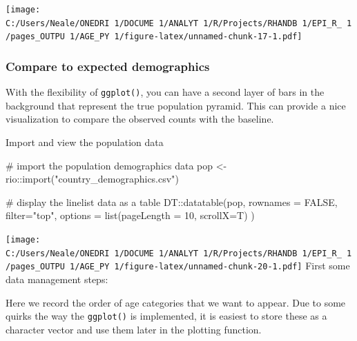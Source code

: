 \documentclass[
]{article}
\newenvironment{Shaded}{\begin{snugshade}}{\end{snugshade}}
\newcommand{\CommentTok}[1]{\textcolor[rgb]{0.50,0.62,0.50}{#1}}
\newcommand{\DataTypeTok}[1]{\textcolor[rgb]{0.87,0.87,0.75}{#1}}
\newcommand{\DecValTok}[1]{\textcolor[rgb]{0.86,0.86,0.80}{#1}}
\newcommand{\KeywordTok}[1]{\textcolor[rgb]{0.94,0.87,0.69}{#1}}
\newcommand{\NormalTok}[1]{\textcolor[rgb]{0.80,0.80,0.80}{#1}}
\newcommand{\OperatorTok}[1]{\textcolor[rgb]{0.94,0.94,0.82}{#1}}
\newcommand{\OtherTok}[1]{\textcolor[rgb]{0.94,0.94,0.56}{#1}}
\newcommand{\StringTok}[1]{\textcolor[rgb]{0.80,0.58,0.58}{#1}}
\begin{document}
\texttt{[image: C:/Users/Neale/ONEDRI~1/DOCUME~1/ANALYT~1/R/Projects/RHANDB~1/EPI\_R\_~1/pages\_OUTPU~1/AGE\_PY~1/figure-latex/unnamed-chunk-17-1.pdf]}

\hypertarget{compare-to-expected-demographics}{%
\subsubsection{Compare to expected
demographics}\label{compare-to-expected-demographics}}

With the flexibility of \texttt{ggplot()}, you can have a second layer
of bars in the background that represent the true population pyramid.
This can provide a nice visualization to compare the observed counts
with the baseline.

Import and view the population data

\begin{Shaded}
\begin{Highlighting}[]
\CommentTok{\# import the population demographics data}
\NormalTok{pop \textless{}{-}}\StringTok{ }\NormalTok{rio}\OperatorTok{::}\KeywordTok{import}\NormalTok{(}\StringTok{"country\_demographics.csv"}\NormalTok{)}
\end{Highlighting}
\end{Shaded}

\begin{Shaded}
\begin{Highlighting}[]
\CommentTok{\# display the linelist data as a table}
\NormalTok{DT}\OperatorTok{::}\KeywordTok{datatable}\NormalTok{(pop, }\DataTypeTok{rownames =} \OtherTok{FALSE}\NormalTok{, }\DataTypeTok{filter=}\StringTok{"top"}\NormalTok{, }\DataTypeTok{options =} \KeywordTok{list}\NormalTok{(}\DataTypeTok{pageLength =} \DecValTok{10}\NormalTok{, }\DataTypeTok{scrollX=}\NormalTok{T) )}
\end{Highlighting}
\end{Shaded}

\texttt{[image: C:/Users/Neale/ONEDRI~1/DOCUME~1/ANALYT~1/R/Projects/RHANDB~1/EPI\_R\_~1/pages\_OUTPU~1/AGE\_PY~1/figure-latex/unnamed-chunk-20-1.pdf]}
First some data management steps:

Here we record the order of age categories that we want to appear. Due
to some quirks the way the \texttt{ggplot()} is implemented, it is
easiest to store these as a character vector and use them later in the
plotting function.
\end{document}
